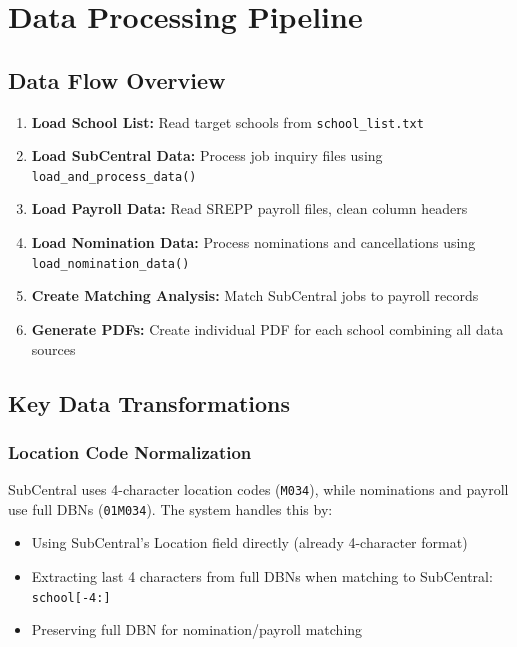 \documentclass[12pt,letterpaper]{article}
\begin{document}
\section{Data Processing Pipeline}

\subsection{Data Flow Overview}

\begin{enumerate}[leftmargin=*]
    \item \textbf{Load School List:} Read target schools from \texttt{school\_list.txt}
    \item \textbf{Load SubCentral Data:} Process job inquiry files using \texttt{load\_and\_process\_data()}
    \item \textbf{Load Payroll Data:} Read SREPP payroll files, clean column headers
    \item \textbf{Load Nomination Data:} Process nominations and cancellations using \texttt{load\_nomination\_data()}
    \item \textbf{Create Matching Analysis:} Match SubCentral jobs to payroll records
    \item \textbf{Generate PDFs:} Create individual PDF for each school combining all data sources
\end{enumerate}

\subsection{Key Data Transformations}

\subsubsection{Location Code Normalization}

SubCentral uses 4-character location codes (\texttt{M034}), while nominations and payroll use full DBNs (\texttt{01M034}). The system handles this by:

\begin{itemize}[leftmargin=*]
    \item Using SubCentral's Location field directly (already 4-character format)
    \item Extracting last 4 characters from full DBNs when matching to SubCentral: \texttt{school[-4:]}
    \item Preserving full DBN for nomination/payroll matching
\end{itemize}
\end{document}
